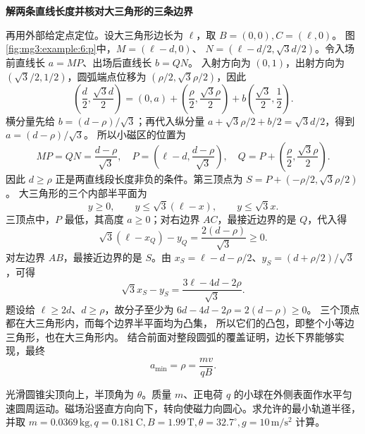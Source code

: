 \begin{solution}
\par\medskip{}\noindent\textbf{解两条直线长度并核对大三角形的三条边界}\par\nobreak
再用外部给定点定位。设大三角形边长为 $\ell$，取 $B=(0,0),C=(\ell,0)$。
图\ref{fig:mg3:example:6:p}中，$M=(\ell-d,0)$、
$N=(\ell-d/2,\sqrt3d/2)$。令入场前直线长 $a=MP$、出场后直线长 $b=QN$。
入射方向为 $(0,1)$，出射方向为 $(\sqrt3/2,1/2)$，圆弧端点位移为
$(\rho/2,\sqrt3\rho/2)$，因此
\[
 \left(\frac d2,\frac{\sqrt3d}{2}\right)
 =(0,a)+\left(\frac\rho2,\frac{\sqrt3\rho}{2}\right)
 +b\left(\frac{\sqrt3}{2},\frac12\right).
\]
横分量先给 $b=(d-\rho)/\sqrt3$；再代入纵分量
$a+\sqrt3\rho/2+b/2=\sqrt3d/2$，得到 $a=(d-\rho)/\sqrt3$。
所以小磁区的位置为
\[
 MP=QN=\frac{d-\rho}{\sqrt3},\quad
 P=\left(\ell-d,\frac{d-\rho}{\sqrt3}\right),\quad
 Q=P+\left(\frac\rho2,\frac{\sqrt3\rho}{2}\right).
\]
因此 $d\ge\rho$ 正是两直线段长度非负的条件。第三顶点为
$S=P+(-\rho/2,\sqrt3\rho/2)$。
大三角形的三个内部半平面为
\[
 y\ge0,\qquad y\le\sqrt3(\ell-x),\qquad y\le\sqrt3x.
\]
三顶点中，$P$ 最低，其高度 $a\ge0$；对右边界 $AC$，最接近边界的是 $Q$，代入得
\[
 \sqrt3(\ell-x_Q)-y_Q=\frac{2(d-\rho)}{\sqrt3}\ge0.
\]
对左边界 $AB$，最接近边界的是 $S$。由
$x_S=\ell-d-\rho/2$、$y_S=(d+\rho/2)/\sqrt3$，可得
\[
 \sqrt3x_S-y_S=\frac{3\ell-4d-2\rho}{\sqrt3}.
\]
题设给 $\ell\ge2d$、$d\ge\rho$，故分子至少为
$6d-4d-2\rho=2(d-\rho)\ge0$。
三个顶点都在大三角形内，而每个边界半平面均为凸集，
所以它们的凸包，即整个小等边三角形，也在大三角形内。
结合前面对整段圆弧的覆盖证明，边长下界能够实现，最终
\[\boxed{a_{\min}=\rho=\frac{mv}{qB}}.\]
\end{solution}
\begin{question}\begin{example}[圆锥外表面运动的最小半径]\label{mg3:example:7}
光滑圆锥尖顶向上，半顶角为 $\theta$。质量 $m$、正电荷 $q$ 的小球在外侧表面作水平匀速圆周运动。磁场沿竖直方向向下，转向使磁力向圆心。求允许的最小轨道半径，并取 $m=0.0369\,\mathrm{kg},q=0.181\,\mathrm C,B=1.99\,\mathrm T,\theta=32.7^\circ,g=10\,\mathrm{m/s^2}$ 计算。
\end{example}
\end{question}
